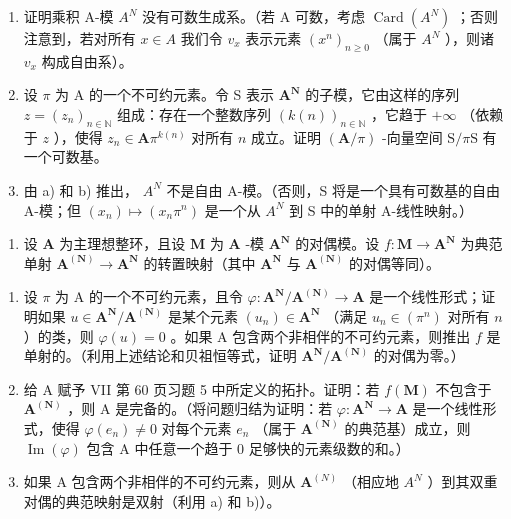 \begin{enumerate}
\def\labelenumi{\alph{enumi})}
\item
  证明乘积 A-模 \(A^{N}\) 没有可数生成系。（若 A 可数，考虑 \(\operatorname{Card}(A^{N})\) ；否则注意到，若对所有 \(x \in A\) 我们令 \(v_{x}\) 表示元素 \((x^{n})_{n \geq 0}\) （属于 \(A^{N}\) ），则诸 \(v_{x}\) 构成自由系）。
\item
  设 \(\pi\) 为 A 的一个不可约元素。令 S 表示 \(\mathbf{A}^{\mathbf{N}}\) 的子模，它由这样的序列 \(z = (z_{n})_{n\in \mathbb{N}}\) 组成：存在一个整数序列 \((k(n))_{n\in \mathbb{N}}\) ，它趋于 \(+\infty\) （依赖于 \(z\) ），使得 \(z_{n}\in \mathbf{A}\pi^{k(n)}\) 对所有 \(n\) 成立。证明 \((\mathbf{A} / \pi)\) -向量空间 \(\mathrm{S} / \pi \mathrm{S}\) 有一个可数基。
\item
  由 a) 和 b) 推出， \(A^{N}\) 不是自由 A-模。（否则，S 将是一个具有可数基的自由 A-模；但 \((x_{n})\mapsto(x_{n}\pi^{n})\) 是一个从 \(A^{N}\) 到 S 中的单射 A-线性映射。）
\end{enumerate}

\begin{enumerate}
\def\labelenumi{\arabic{enumi})}
\setcounter{enumi}{8}
\tightlist
\item
  设 \(\mathbf{A}\) 为主理想整环，且设 \(\mathbf{M}\) 为 \(\mathbf{A}\) -模 \(\mathbf{A}^{\mathbf{N}}\) 的对偶模。设 \(f: \mathbf{M} \to \mathbf{A}^{\mathbf{N}}\) 为典范单射 \(\mathbf{A}^{(\mathbf{N})} \to \mathbf{A}^{\mathbf{N}}\) 的转置映射（其中 \(\mathbf{A}^{\mathbf{N}}\) 与 \(\mathbf{A}^{(\mathbf{N})}\) 的对偶等同）。
\end{enumerate}

\begin{enumerate}
\def\labelenumi{\alph{enumi})}
\item
  设 \(\pi\) 为 A 的一个不可约元素，且令 \(\varphi: \mathbf{A}^{\mathbf{N}} / \mathbf{A}^{(\mathbf{N})} \to \mathbf{A}\) 是一个线性形式；证明如果 \(u \in \mathbf{A}^{\mathbf{N}} / \mathbf{A}^{(\mathbf{N})}\) 是某个元素 \((u_n) \in \mathbf{A}^{\mathbf{N}}\) （满足 \(u_n \in (\pi^n)\) 对所有 \(n\) ）的类，则 \(\varphi(u) = 0\) 。如果 A 包含两个非相伴的不可约元素，则推出 \(f\) 是单射的。（利用上述结论和贝祖恒等式，证明 \(\mathbf{A}^{\mathbf{N}} / \mathbf{A}^{(\mathbf{N})}\) 的对偶为零。）
\item
  给 A 赋予 VII 第 60 页习题 5 中所定义的拓扑。证明：若 \(f(\mathbf{M})\) 不包含于 \(\mathbf{A}^{(\mathbf{N})}\) ，则 A 是完备的。（将问题归结为证明：若 \(\varphi : \mathbf{A}^{\mathbf{N}} \to \mathbf{A}\) 是一个线性形式，使得 \(\varphi(e_n) \neq 0\) 对每个元素 \(e_n\) （属于 \(\mathbf{A}^{(\mathbf{N})}\) 的典范基）成立，则 \(\operatorname{Im}(\varphi)\) 包含 A 中任意一个趋于 0 足够快的元素级数的和。）
\item
  如果 A 包含两个非相伴的不可约元素，则从 \(\mathbf{A}^{(N)}\) （相应地 \(A^{N}\) ）到其双重对偶的典范映射是双射（利用 a) 和 b)）。
\end{enumerate}

